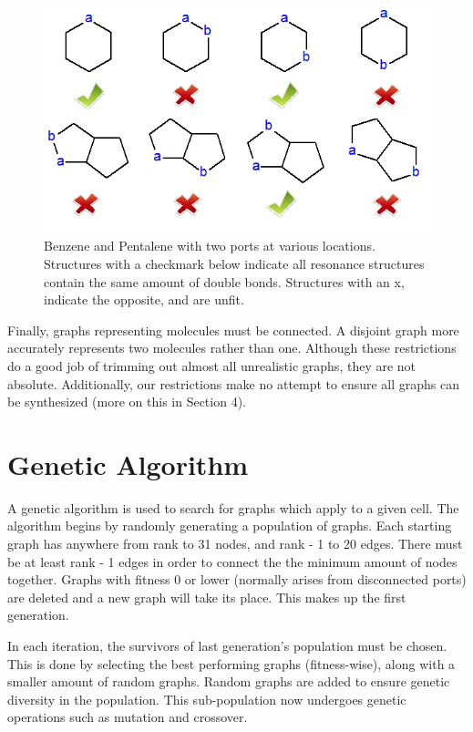 \documentclass[12pt]{article}
\begin{document}
\begin{figure}[ht!]
\centering
\includegraphics[width=130mm]{checkMarks.png}
\caption{Benzene and Pentalene with two ports at various locations. Structures with a checkmark below indicate all resonance structures contain the same amount of double bonds. Structures with an x, indicate the opposite, and are unfit.}
\label{fig:checkMarks}
\end{figure}

Finally, graphs representing molecules must be connected. A disjoint graph more accurately represents two molecules rather than one. Although these restrictions do a good job of trimming out almost all unrealistic graphs, they are not absolute. Additionally, our restrictions make no attempt to ensure all graphs can be synthesized (more on this in Section 4). 

\section{Genetic Algorithm}

A genetic algorithm is used to search for graphs which apply to a given cell. The algorithm begins by randomly generating a population of graphs. Each starting graph has anywhere from rank to 31 nodes, and rank - 1 to 20 edges. There must be at least rank - 1 edges in order to connect the the minimum amount of nodes together. Graphs with fitness 0 or lower (normally arises from disconnected ports) are deleted and a new graph will take its place. This makes up the first generation.

In each iteration, the survivors of last generation's population must be chosen. This is done by selecting the best performing graphs (fitness-wise), along with a smaller amount of random graphs. Random graphs are added to ensure genetic diversity in the population. This sub-population now undergoes genetic operations such as mutation and crossover. 
\end{document}
